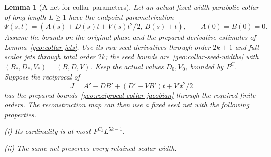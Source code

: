 \documentclass[11pt]{amsart}
\newtheorem{lemma}[theorem]{Lemma}
\theoremstyle{definition}
\theoremstyle{remark}
\numberwithin{equation}{section}
\begin{document}
\begin{lemma}[A net for collar parameters]\label{surf:collar-net}
Let an actual fixed-width parabolic collar of long length $L\ge1$ have the endpoint parametrization
\[
 \Psi(s,t)=(A(s)+D(s)t+V(s)t^2/2,\ B(s)+t),\qquad A(0)=B(0)=0.
\]
Assume the bounds on the original phase and the prepared derivative estimates of Lemma~\ref{geo:collar-jets}. Use its raw seed derivatives through order $2k+1$ and full scalar jets through total order $2k$; the seed bounds are~\eqref{geo:collar-seed-widths} with $(B_*,D_*,V_*)=(B,D,V)$. Keep the actual values $D_0,V_0$, bounded by $P^C$. Suppose the reciprocal of
\[
J=A'-DB'+(D'-VB')t+V't^2/2
\]
has the prepared bounds~\eqref{geo:reciprocal-collar-jacobian} through the required finite orders. The reconstruction map can then use a fixed seed net with the following properties.

\noindent\textup{(i)} Its cardinality is at most $P^{C_k}L^{5k-1}$.

\noindent\textup{(ii)} The same net preserves every retained scalar width.
\end{lemma}
\end{document}
